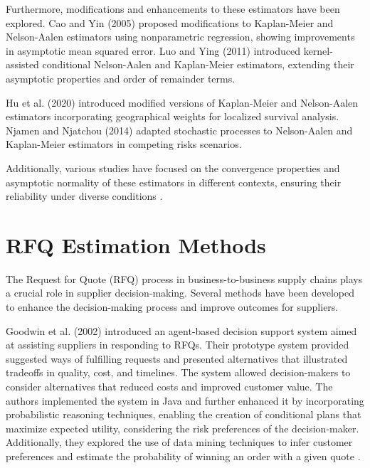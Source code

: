 Furthermore, modifications and enhancements to these estimators have been explored. Cao and Yin (2005) \cite{cao2005presmoothed} proposed modifications to Kaplan-Meier and Nelson-Aalen estimators using nonparametric regression, showing improvements in asymptotic mean squared error. Luo and Ying (2011) \cite{luo2011conditional} introduced kernel-assisted conditional Nelson-Aalen and Kaplan-Meier estimators, extending their asymptotic properties and order of remainder terms.

Hu et al. (2020) \cite{hu2020modified} introduced modified versions of Kaplan-Meier and Nelson-Aalen estimators incorporating geographical weights for localized survival analysis. Njamen and Njatchou (2014) \cite{njamen2014nelson} adapted stochastic processes to Nelson-Aalen and Kaplan-Meier estimators in competing risks scenarios.

Additionally, various studies have focused on the convergence properties and asymptotic normality of these estimators in different contexts, ensuring their reliability under diverse conditions \cite{zhousemiparametric}\cite{anevski2017functional}\cite{njomen2019asymptotic}.

\section{RFQ Estimation Methods}
The Request for Quote (RFQ) process in business-to-business supply chains plays a crucial role in supplier decision-making. Several methods have been developed to enhance the decision-making process and improve outcomes for suppliers.

Goodwin et al. (2002) introduced an agent-based decision support system aimed at assisting suppliers in responding to RFQs. Their prototype system provided suggested ways of fulfilling requests and presented alternatives that illustrated tradeoffs in quality, cost, and timelines. The system allowed decision-makers to consider alternatives that reduced costs and improved customer value. The authors implemented the system in Java and further enhanced it by incorporating probabilistic reasoning techniques, enabling the creation of conditional plans that maximize expected utility, considering the risk preferences of the decision-maker. Additionally, they explored the use of data mining techniques to infer customer preferences and estimate the probability of winning an order with a given quote \cite{goodwin2002decision}.

